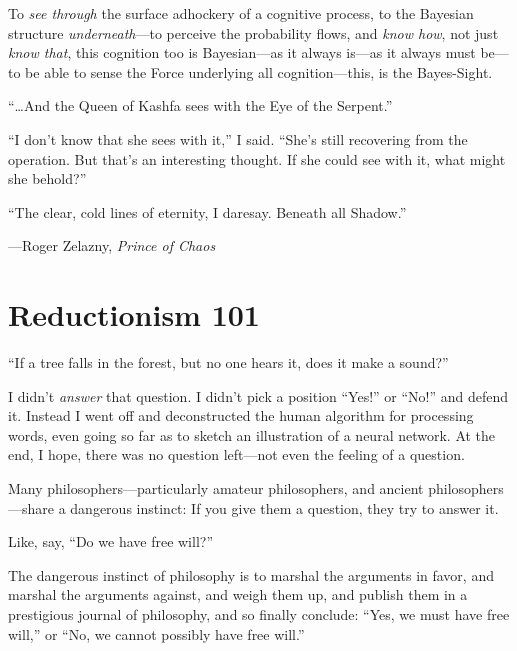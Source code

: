 {
 To \textit{see through} the surface adhockery of a cognitive
process, to the Bayesian structure \textit{underneath}{}---to perceive
the probability flows, and \textit{know how}, not just \textit{know
that}, this cognition too is Bayesian---as it always is---as it always
must be---to be able to sense the Force underlying all
cognition---this, is the Bayes-Sight.}

{
 ``\ldots And the Queen of Kashfa sees with the Eye
of the Serpent.''}

{
 ``I don't know that she sees with
it,'' I said.
``She's still recovering from the
operation. But that's an interesting thought. If she
could see with it, what might she behold?''}

{
 ``The clear, cold lines of eternity, I daresay.
Beneath all Shadow.''}

{\raggedleft
 {}---Roger Zelazny, \textit{Prince of Chaos}
\par}


\bigskip

\myendsectiontext


\bigskip

\chapter{Reductionism 101}


{
 ``If a tree falls in the forest, but no one hears
it, does it make a sound?'' }

{
 I didn't \textit{answer} that question. I
didn't pick a position
``Yes!'' or
``No!'' and defend it. Instead I
went off and deconstructed the human algorithm for processing words,
even going so far as to sketch an illustration of a neural network. At
the end, I hope, there was no question left---not even the feeling of a
question.}

{
 Many philosophers---particularly amateur philosophers, and ancient
philosophers---share a dangerous instinct: If you give them a question,
they try to answer it.}

{
 Like, say, ``Do we have free
will?''}

{
 The dangerous instinct of philosophy is to marshal the arguments
in favor, and marshal the arguments against, and weigh them up, and
publish them in a prestigious journal of philosophy, and so finally
conclude: ``Yes, we must have free
will,'' or ``No, we cannot possibly
have free will.''}

